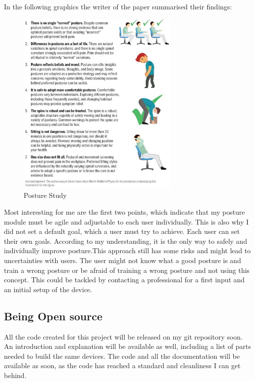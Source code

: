 In the following graphics the writer of the paper summarised their findings:
\begin{figure}[h]
  \begin{center}
\includegraphics[width=0.7\textwidth]{images/jospt-562-fig001.jpg}
  \end{center}
  \caption{Posture Study \cite{SitUpSt77:online}}
  \label{fig:Posture Study}
\end{figure}

Most interesting for me are the first two points, which indicate that my posture module must be agile and adjustable to each user individually. This is also why I did not set a default goal, which a user must try to achieve. Each user can set their own goals. According to my understanding, it is the only way to safely and individually improve posture.This approach still has some risks and might lead to uncertainties with users. 
The user might not know what a good posture is and train a wrong posture or be afraid of training a wrong posture and not using this concept. This could be tackled by contacting a professional for a first input and an initial setup of the device.

\subsection{Being Open source}

All the code created for this project will be released on my git repository soon. An introduction and explanation will be available as well, including a list of parts needed to build the same devices. The code and all the documentation will be available as soon, as the code has reached a standard and cleanliness I can get behind.

